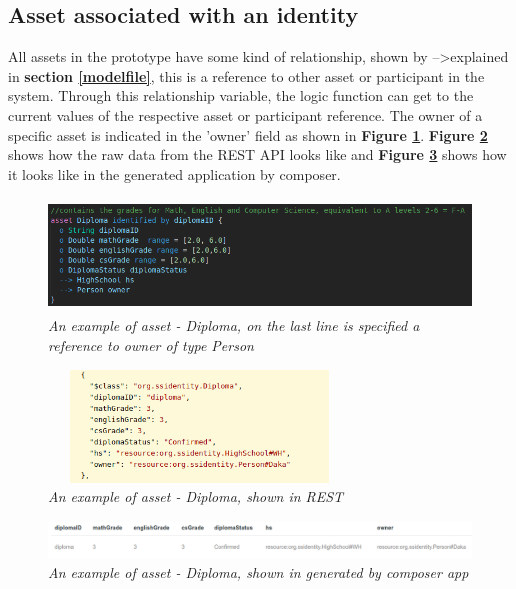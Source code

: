 \documentclass[a4paper,11pt]{report}
\begin{document}
\subsection{Asset associated with an identity}
All assets in the prototype have some kind of relationship, shown by --\textgreater explained in \textbf{section \ref{modelfile}}, this is a reference to other asset or participant in the system. Through this relationship variable, the logic function can get to the current values of the respective asset or participant reference. 
	The owner of a specific asset is indicated in the 'owner' field as shown in \textbf{Figure \ref{diplomaAsset}}. \textbf{Figure \ref{diplomaAssetREST}} shows how the raw data from the REST API looks like and \textbf{Figure \ref{gendiplomaAsset}} shows how it looks like in the generated application by composer.  

\begin{figure}[h]
\centering
  \includegraphics[height = 3cm ,width = 16cm]{diploma.png}
  \caption{\textit{An example of asset - Diploma, on the last line is specified a reference to owner of type Person }}
  \label{diplomaAsset}
\end{figure}

\begin{figure}[h]
\centering
  \includegraphics[height = 3cm ,width = 8cm]{diplomaAssetREST.png}
  \caption{\textit{ An example of asset - Diploma, shown in REST }}
  \label{diplomaAssetREST}
\end{figure}

\begin{figure}[h]
\centering
  \includegraphics[height = 1cm ,width = 16cm]{genappDiploma.png}
  \caption{\textit{An example of asset - Diploma, shown in generated by composer app }}
  \label{gendiplomaAsset}
\end{figure}
\end{document}
